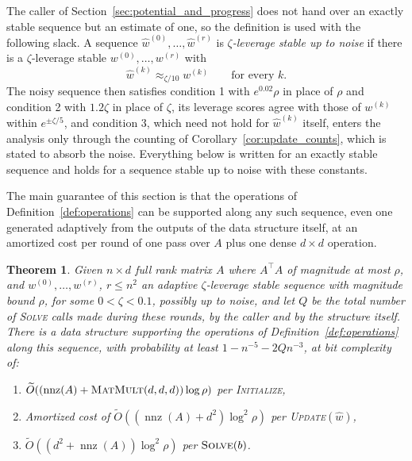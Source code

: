 \documentclass[11pt]{article}
\newtheorem{theorem}{Theorem}
\newcommand{\nnz}{\operatorname{nnz}}
\newcommand{\MM}{\textsc{MatMult}}
\renewcommand{\O}{\widetilde O}
\newcommand{\what}{\widehat{w}}
\begin{document}
The caller of Section~\ref{sec:potential_and_progress} does not hand over an
exactly stable sequence but an estimate of one, so the definition is used with
the following slack.
A sequence $\what^{(0)}, \ldots, \what^{(r)}$ is
\emph{$\zeta$-leverage stable up to noise} if there is a
$\zeta$-leverage stable
$w^{(0)}, \ldots, w^{(r)}$ with
\[
\what^{(k)} \approx_{\zeta / 10} w^{(k)}
\qquad\text{for every } k .
\]
The noisy sequence then satisfies condition 1 with $e^{0.02} \rho$ in place of
$\rho$ and condition 2 with
$1.2 \zeta$ in place of
$\zeta$, its leverage scores agree with those of
$w^{(k)}$ within
$e^{\pm \zeta / 5}$, and condition 3, which need not hold for
$\what^{(k)}$ itself, enters the analysis only through the counting of
Corollary~\ref{cor:update_counts}, which is stated to absorb the noise.
Everything below is written for an exactly stable sequence and holds for a
sequence stable up to noise with these constants.

The main guarantee of this section is that the operations of
Definition~\ref{def:operations} can be supported along any such sequence, even
one generated adaptively from the outputs of the data structure itself, at an
amortized cost per round of one pass over $A$ plus one dense
$d \times d$ operation.

\begin{theorem}
\label{thm:inv_maintain_stable}
Given $n \times d$ full rank matrix
$A$ where
$A^\top A$ of magnitude at most
$\rho$, and
$w^{(0)}, \ldots, w^{(r)}$,
$r \le n^{2}$ an adaptive
$\zeta$-leverage stable sequence with magnitude bound
$\rho$, for some
$0 < \zeta < 0.1$, possibly up to noise, and let
$Q$ be the total number of \textsc{Solve} calls made during these rounds, by the
caller and by the structure itself.
There is a data structure supporting the operations of
Definition~\ref{def:operations} along this sequence, with probability at least
$1 - n^{-5} - 2 Q n^{-3}$, at bit complexity of:
\begin{enumerate}
\item \label{itm:inv_maintain_stable:1}
  $\O( ( \nnz(A) + \MM(d, d, d) ) \log \rho)$ per \textsc{Initialize},
\item \label{itm:inv_maintain_stable:2} Amortized cost of
  $\O( (\nnz(A) + d^2) \log^2 \rho )$ per
  \textsc{Update}$(\what)$,
\item \label{itm:inv_maintain_stable:3} $\O( (d^2+ \nnz(A)) \log^2 \rho )$ per
  $\textsc{Solve}(b)$.
\end{enumerate}
\end{theorem}
\end{document}
